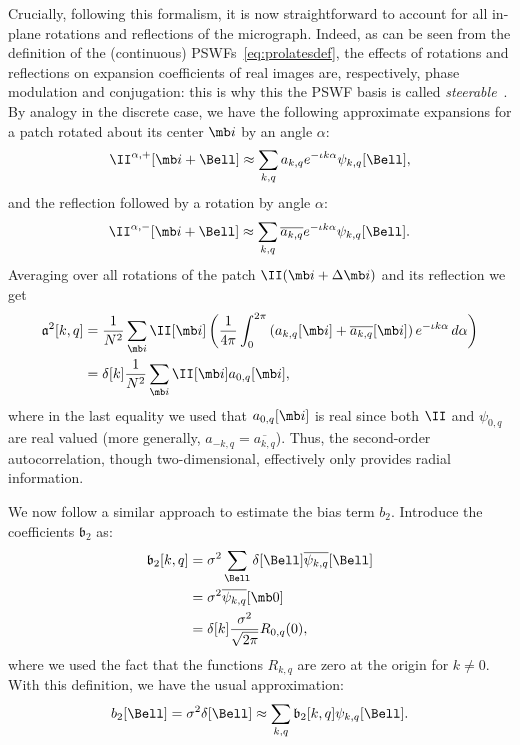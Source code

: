 \documentclass[9pt,twocolumn,twoside,lineno]{pnas-new}
\begin{document}
Crucially, following this formalism, it is now straightforward to account for all in-plane rotations and reflections of the micrograph. Indeed, as can be seen from the definition of the (continuous) PSWFs~\eqref{eq:prolatesdef}, the effects of rotations and reflections on expansion coefficients of real images are, respectively, phase modulation and conjugation: this is why this the PSWF basis is called \emph{steerable}~\cite{landa2017steerable,zhao2016fast}. By analogy in the discrete case, we have the following approximate expansions for a patch rotated about its center $\mb i$ by an angle $\alpha$:
\[ \II^{\alpha,+}[\mb i+\Bell] \approx \sum_{k,q}a_{k,q}e^{-\iota k\alpha}\psi_{k,q}[\Bell],\]
and the reflection followed by a rotation by angle $\alpha$:
\[ \II^{\alpha,-}[\mb i+\Bell] \approx \sum_{k,q}\overline{a_{k,q}}e^{-\iota k\alpha}\psi_{k,q}[\Bell].\]
Averaging over all rotations of the patch $\II(\mb i + \Delta\mb i)$ and its reflection we get
\begin{align} \label{eq:second_order_ac_pswf}
\mathfrak{a}^2[k,q] &= \frac{1}{N^2}\sum_{\mb i}\II[\mb i]\left(\frac{1}{4\pi}\int_0^{2\pi}\left(a_{k,q}[\mb i] +
\overline{a_{k,q}}[\mb i]\right)e^{-\iota k\alpha}\, d\alpha\right)\nonumber\\ 
&= \delta[k] \frac{1}{N^2}\sum_{\mb i}\II[\mb i]a_{0,q}[\mb i], 
\end{align}
where in the last equality we used that $a_{0,q}[\mb i]$ is real since both $\II$ and $\psi_{0,q}$ are real valued (more generally, $a_{-k,q}=\overline{a_{k,q}}$).
Thus, the second-order autocorrelation, though two-dimensional, effectively only provides radial information.

We now follow a similar approach to estimate the bias term $b_2$.
Introduce the coefficients $\mathfrak{b}_2$ as:
\[\begin{aligned} 
\mathfrak{b}_2[k,q] & = \sigma^2\sum_{\Bell}\delta[\Bell]\overline{\psi_{k,q}}[\Bell]\\
&= \sigma^2\overline{\psi_{k,q}}[\mb 0]\\
&= \delta[k] \frac{\sigma^2}{\sqrt{2\pi}}R_{0,q}(0), \end{aligned}\]
where we used the fact that the functions $R_{k,q}$ are zero at the origin for $k\neq 0$.
With this definition, we have the usual approximation:
\[ b_2[\Bell] = \sigma^2\delta[\Bell] \approx \sum_{k,q}\mathfrak{b}_2[k,q]\psi_{k,q}[\Bell].\]
\end{document}
